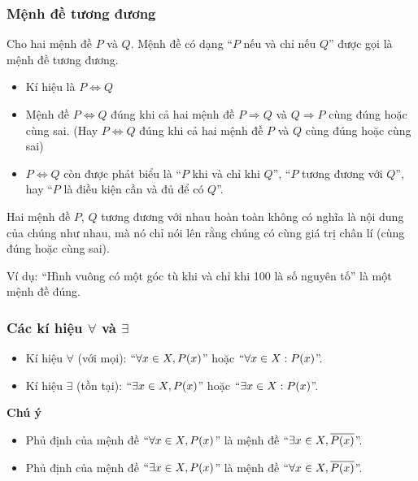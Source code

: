 \subsubsection{Mệnh đề tương đương}
\begin{dn}
	Cho hai mệnh đề $P$ và $Q$. Mệnh đề có dạng ``$P$ nếu và chỉ nếu $Q$'' được gọi là mệnh đề tương đương.
	\begin{itemize}
		\item Kí hiệu là $P \Leftrightarrow Q$
		\item Mệnh đề $P \Leftrightarrow Q$ đúng khi cả hai mệnh đề $P\Rightarrow Q$ và $Q \Rightarrow P$ cùng đúng hoặc cùng sai. (Hay $P \Leftrightarrow Q$ đúng khi cả hai mệnh đề $P$ và $Q$ cùng đúng hoặc cùng sai) 
		\item $P\Leftrightarrow Q$ còn được phát biểu là ``$P$ khi và chỉ khi $Q$'', ``$P$ tương đương với $Q$'', hay ``$P$ là điều kiện cần và đủ để có $Q$''.
	\end{itemize}
\end{dn}
\begin{note}
	Hai mệnh đề $P$, $Q$ tương đương với nhau hoàn toàn không có nghĩa là nội dung của chúng như nhau, mà nó chỉ nói lên rằng chúng có cùng giá trị chân lí (cùng đúng hoặc cùng sai).
	
	Ví dụ: ``Hình vuông có một góc tù khi và chỉ khi 100 là số nguyên tố'' là một mệnh đề đúng.
\end{note}
\subsubsection{Các kí hiệu $\forall$ và $\exists$}
\begin{itemize}
	\item Kí hiệu $\forall$ (với mọi): $``\forall x \in X, P(x)$'' hoặc $``\forall x \in X : P(x)$''.
	\item Kí hiệu $\exists$ (tồn tại): $``\exists x \in X, P(x)$'' hoặc $``\exists x \in X : P(x)$''.
\end{itemize}
\begin{note} \textbf{Chú ý}
	\begin{itemize}
		\item Phủ định của mệnh đề $``\forall x \in X, P(x)$'' là mệnh đề $``\exists x\in X, \overline{P(x)}$''.
		\item Phủ định của mệnh đề $``\exists x\in X, P(x)$'' là mệnh đề  $``\forall x\in X, \overline{P(x)}$''.
	\end{itemize}
\end{note}

